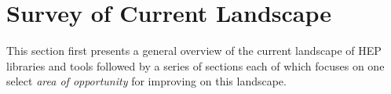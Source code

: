 \section{Survey of Current Landscape}

This section first presents a general overview of the current landscape of HEP libraries and tools followed by a series of sections each of which focuses on one select \textit{area of opportunity} for improving on this landscape. 











